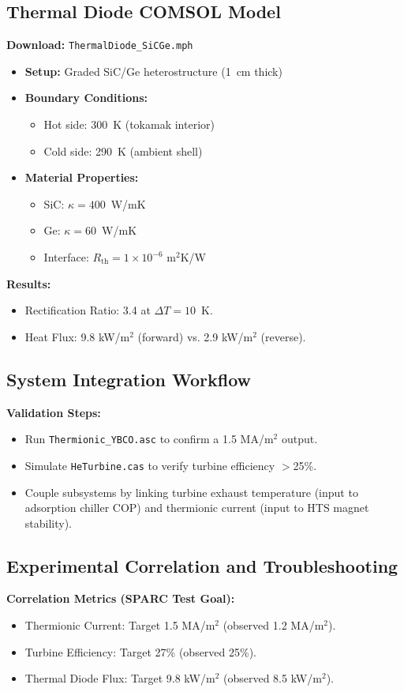 \documentclass[12pt]{article}
\begin{document}
\subsection{Thermal Diode COMSOL Model}
\textbf{Download:} \texttt{ThermalDiode\_SiCGe.mph}
\begin{itemize}
    \item \textbf{Setup:} Graded SiC/Ge heterostructure (1~cm thick)
    \item \textbf{Boundary Conditions:}
    \begin{itemize}
        \item Hot side: 300~K (tokamak interior)
        \item Cold side: 290~K (ambient shell)
    \end{itemize}
    \item \textbf{Material Properties:}
    \begin{itemize}
        \item SiC: $\kappa = 400$~W/mK
        \item Ge: $\kappa = 60$~W/mK
        \item Interface: $R_{\text{th}} = 1\times10^{-6}$ m$^2$K/W
    \end{itemize}
\end{itemize}

\textbf{Results:}
\begin{itemize}
    \item Rectification Ratio: 3.4 at $\Delta T = 10$~K.
    \item Heat Flux: 9.8 kW/m$^2$ (forward) vs. 2.9 kW/m$^2$ (reverse).
\end{itemize}

\subsection{System Integration Workflow}
\textbf{Validation Steps:}
\begin{itemize}
    \item Run \texttt{Thermionic\_YBCO.asc} to confirm a 1.5 MA/m$^2$ output.
    \item Simulate \texttt{HeTurbine.cas} to verify turbine efficiency $>$25\%.
    \item Couple subsystems by linking turbine exhaust temperature (input to adsorption chiller COP) and thermionic current (input to HTS magnet stability).
\end{itemize}

\subsection{Experimental Correlation and Troubleshooting}
\textbf{Correlation Metrics (SPARC Test Goal):}
\begin{itemize}
    \item Thermionic Current: Target 1.5 MA/m$^2$ (observed 1.2 MA/m$^2$).
    \item Turbine Efficiency: Target 27\% (observed 25\%).
    \item Thermal Diode Flux: Target 9.8 kW/m$^2$ (observed 8.5 kW/m$^2$).
\end{itemize}
\end{document}
